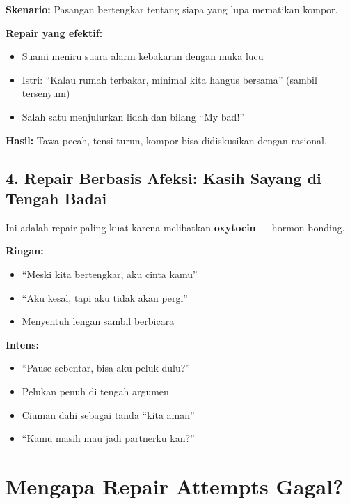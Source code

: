 \begin{exercisebox}
\textbf{Skenario:} Pasangan bertengkar tentang siapa yang lupa mematikan kompor.

\textbf{Repair yang efektif:}
\begin{itemize}
    \item Suami meniru suara alarm kebakaran dengan muka lucu
    \item Istri: ``Kalau rumah terbakar, minimal kita hangus bersama'' (sambil tersenyum)
    \item Salah satu menjulurkan lidah dan bilang ``My bad!''
\end{itemize}

\textbf{Hasil:} Tawa pecah, tensi turun, kompor bisa didiskusikan dengan rasional.
\end{exercisebox}

\subsection{4. Repair Berbasis Afeksi: Kasih Sayang di Tengah Badai}

Ini adalah repair paling kuat karena melibatkan \textbf{oxytocin} --- hormon bonding.

\begin{tipbox}
\textbf{Ringan:}
\begin{itemize}
    \item ``Meski kita bertengkar, aku cinta kamu''
    \item ``Aku kesal, tapi aku tidak akan pergi''
    \item Menyentuh lengan sambil berbicara
\end{itemize}

\textbf{Intens:}
\begin{itemize}
    \item ``Pause sebentar, bisa aku peluk dulu?''
    \item Pelukan penuh di tengah argumen
    \item Ciuman dahi sebagai tanda ``kita aman''
    \item ``Kamu masih mau jadi partnerku kan?''
\end{itemize}
\end{tipbox}

\section{Mengapa Repair Attempts Gagal?}

